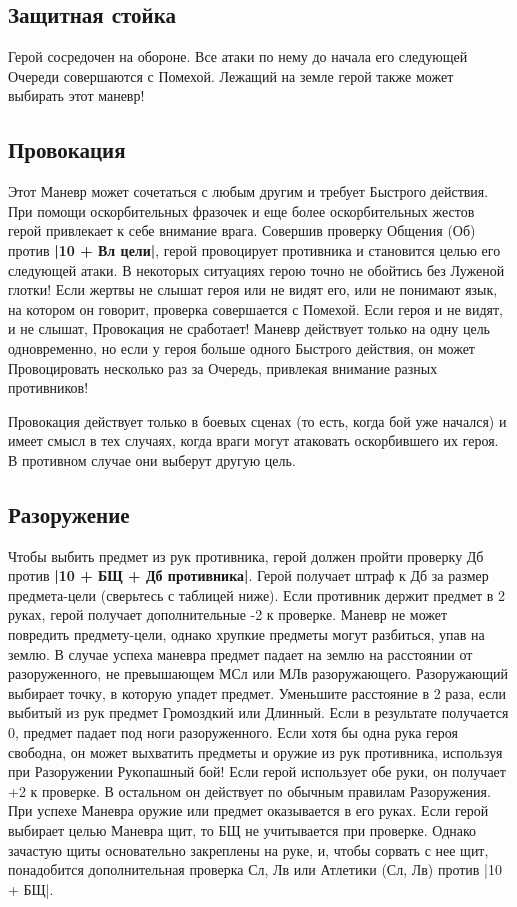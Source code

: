 \subsection{Защитная стойка}
Герой сосредочен на обороне. Все атаки по нему до начала его следующей Очереди совершаются с Помехой. Лежащий на земле герой также может выбирать этот маневр!
\subsection{Провокация}
Этот Маневр может сочетаться с любым другим и требует Быстрого действия. При помощи оскорбительных фразочек и еще более оскорбительных жестов герой привлекает к себе внимание врага. Совершив проверку Общения (Об) против \textbf{|10 + Вл цели|}, герой провоцирует противника и становится целью его следующей атаки. В некоторых ситуациях герою точно не обойтись без Луженой глотки!
Если жертвы не слышат героя или не видят его, или не понимают язык, на котором он говорит, проверка совершается с Помехой. Если героя и не видят, и не слышат, Провокация не сработает! Маневр действует только на одну цель одновременно, но если у героя больше одного Быстрого действия, он может Провоцировать несколько раз за Очередь, привлекая внимание разных противников!
\begin{tcolorbox}
Провокация действует только в боевых сценах (то есть, когда бой уже начался) и имеет смысл в тех случаях, когда враги могут атаковать оскорбившего их героя. В противном случае они выберут другую цель. 
\end{tcolorbox}
\subsection{Разоружение}
Чтобы выбить предмет из рук противника, герой должен пройти проверку Дб против \textbf{|10 + БЩ + Дб противника|}. Герой получает штраф к Дб за размер предмета-цели (сверьтесь с таблицей ниже). Если противник держит предмет в 2 руках, герой получает дополнительные -2 к проверке. Маневр не может повредить предмету-цели, однако хрупкие предметы могут разбиться, упав на землю. В случае успеха маневра предмет падает на землю на расстоянии от разоруженного, не превышающем МСл или МЛв разоружающего. Разоружающий выбирает точку, в которую упадет предмет. Уменьшите расстояние в 2 раза, если выбитый из рук предмет Громоздкий или Длинный. Если в результате получается 0, предмет падает под ноги разоруженного.
\newline
Если хотя бы одна рука героя свободна, он может выхватить предметы и оружие из рук противника, используя при Разоружении Рукопашный бой! Если герой использует обе руки, он получает +2 к проверке. В остальном он действует по обычным правилам Разоружения. При успехе Маневра оружие или предмет оказывается в его руках. Если герой выбирает целью Маневра щит, то БЩ не учитывается при проверке. Однако зачастую щиты основательно закреплены на руке, и, чтобы сорвать с нее щит, понадобится дополнительная проверка Сл, Лв или Атлетики (Сл, Лв) против |10 + БЩ|.
